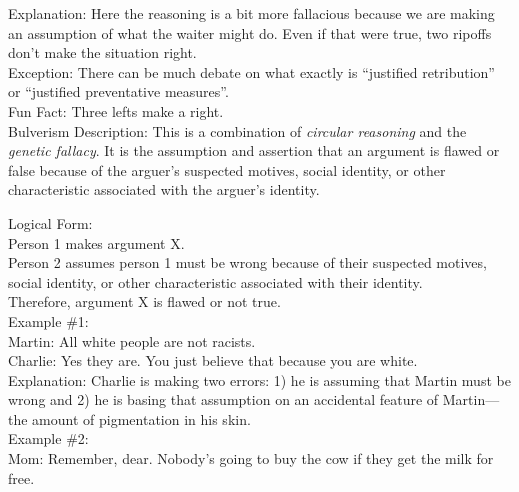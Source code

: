 \documentclass[a4paper,12pt,single,pdftex]{scrartcl}
\begin{document}
    
      Explanation: Here the reasoning is a bit more fallacious because we are making an assumption of what the waiter might do.  Even if that were true, two ripoffs don’t make the situation right.
    \\

    
      Exception: There can be much debate on what exactly is “justified retribution” or “justified preventative measures”.
    \\

    
      Fun Fact: Three lefts make a right.
    \\

  

Bulverism
    Description: This is a combination of {\it circular reasoning}  and the {\it genetic fallacy}. It is the assumption and assertion that an argument is flawed or false because of the arguer's suspected motives, social identity, or other characteristic associated with the arguer's identity.

    
      Logical Form:
    \\

    
      Person 1 makes argument X.
    \\

    
      Person 2 assumes person 1 must be wrong because of their suspected motives, social identity, or other characteristic associated with their identity.
    \\

    
      Therefore, argument X is flawed or not true.
    \\

    
      Example \#1:
    \\

    
      Martin: All white people are not racists.
    \\

    
      Charlie: Yes they are. You just believe that because you are white.
    \\

    
      Explanation: Charlie is making two errors: 1) he is assuming that Martin must be wrong and 2) he is basing that assumption on an accidental feature of Martin—the amount of pigmentation in his skin.
    \\

    
      Example \#2:
    \\

    
      Mom: Remember, dear. Nobody's going to buy the cow if they get the milk for free.
    \\
\end{document}
